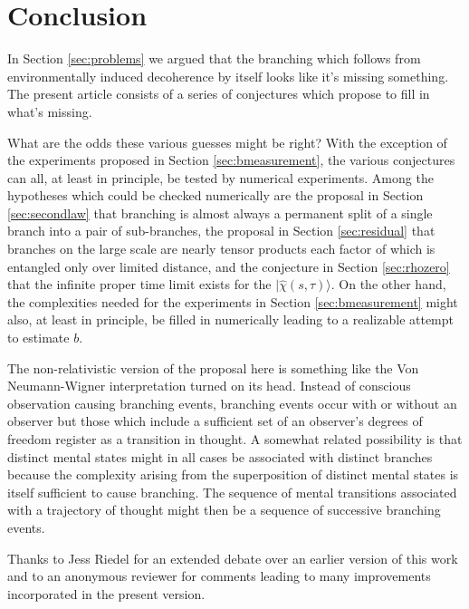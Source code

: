 \documentclass[12pt,amsmath,amssymb,onecolumn]{revtex4-2}
\begin{document}
\section{\label{sec:conclusion}Conclusion}

In Section \ref{sec:problems} we argued
that the branching which follows from environmentally induced decoherence
by itself looks like it's missing something. 
The present article consists of a series of
conjectures which propose to fill in what's missing. 

What are the odds these various guesses might be right?
With the exception of the experiments
proposed in Section \ref{sec:bmeasurement},
the various conjectures can all, at least in principle,
be tested by numerical experiments.
Among the hypotheses which could be checked numerically
are the proposal in Section \ref{sec:secondlaw}
that branching is almost always a permanent split of a
single branch into a pair of sub-branches, 
the proposal in Section \ref{sec:residual} that branches
on the large scale are nearly tensor products each factor of which is
entangled only over limited distance, and the conjecture
in Section \ref{sec:rhozero} that the
infinite proper time limit exists for the $|\hat{\chi}(s, \tau) \rangle $.
On the other hand, the complexities needed for the
experiments in Section \ref{sec:bmeasurement}
might also, at least in principle, be filled in numerically
leading to a realizable attempt to estimate $b$.

The non-relativistic version of the proposal here is something like the Von Neumann-Wigner
interpretation \cite{Vonneumann, Wigner, London} turned on its head. Instead of
conscious
observation causing branching events, branching
events occur with or without an observer but
those which include a sufficient set of
an observer's degrees of freedom
register as a transition in thought.
A somewhat related
possibility is that
distinct mental
states might in all cases be associated with
distinct branches because
the complexity arising from
the superposition of distinct mental states
is itself sufficient to cause branching.
The sequence 
of mental transitions associated with a trajectory of
thought might then be a sequence of successive
branching events.




\begin{acknowledgments}
Thanks to Jess Riedel for an extended debate over an earlier
version of this work and to an anonymous reviewer for
comments leading to many improvements incorporated in the present version.
\end{acknowledgments}
\end{document}
